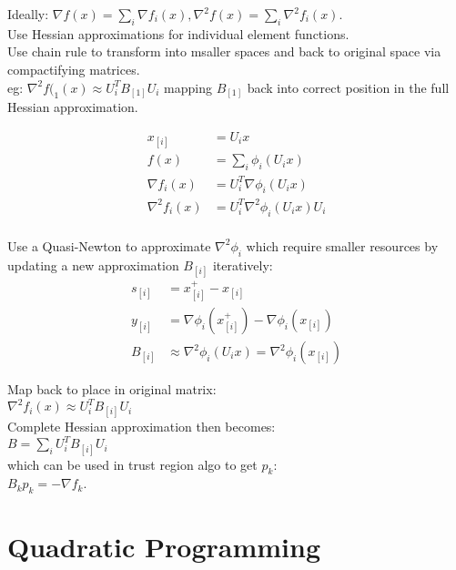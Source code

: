 \documentclass[8pt,letter]{article}
\begin{document}
\begin{multicols*}{2}
    Ideally: $\nabla f(x) = \sum_i \nabla f_i(x), \nabla^2 f(x) = \sum_i \nabla^2 f_i(x)$.\\

    Use Hessian approximations for individual element functions.\\ 

    Use chain rule to transform into msaller spaces and back to original space via compactifying matrices.\\

    eg: $\nabla^2 f(_1(x) \approx U_i^T B_{[1]} U_i$ mapping $B_{[1]}$ back into correct position in the full Hessian approximation.

    \begin{align*}
      x_{[i]} &= U_i x\\
      f(x) &= \sum_i \phi_i(U_i x)\\
      \nabla f_i(x) &= U_i^T \nabla \phi_i(U_i x)\\
      \nabla^2 f_i(x) &= U_i^T \nabla^2 \phi_i(U_i x) U_i\\
    \end{align*}

    Use a Quasi-Newton to approximate $\nabla^2 \phi_i$ which require smaller resources by updating a new approximation $B_{[i]}$ iteratively:
    \begin{align*}
      s_{[i]} & = x_{[i]}^+ - x_{[i]}\\
      y_{[i]} & = \nabla \phi_i(x_{[i]}^+) - \nabla \phi_i(x_{[i]})\\
      B_{[i]} & \approx \nabla^2 \phi_i(U_i x) = \nabla^2 \phi_i(x_{[i]})
    \end{align*}

    Map back to place in original matrix:\\

    $\nabla^2 f_i(x) \approx U_i^T B_{[i]} U_i$\\

    Complete Hessian approximation then becomes:\\

    $B = \sum_i U_i^T B_{[i]} U_i$\\

    which can be used in trust region algo to get $p_k$:\\
    
    $B_k p_k = -\nabla f_k$.

    \vfill\null
    \pagebreak

    \section{Quadratic Programming}


\end{multicols*}
\end{document}
